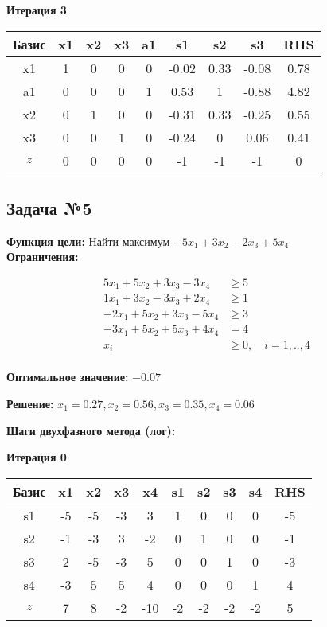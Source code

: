 \documentclass[a4paper,12pt]{article}
\begin{document}
 \textbf{Итерация 3}\\
\begin{tabular}{|c|c|c|c|c|c|c|c|c|}
\hline
Базис & x1 & x2 & x3 & a1 & s1 & s2 & s3 & RHS \\ \hline
x1 & 1 & 0 & 0 & 0 & -0.02 & 0.33 & -0.08 & 0.78 \\ \hline
a1 & 0 & 0 & 0 & 1 & 0.53 & 1 & -0.88 & 4.82 \\ \hline
x2 & 0 & 1 & 0 & 0 & -0.31 & 0.33 & -0.25 & 0.55 \\ \hline
x3 & 0 & 0 & 1 & 0 & -0.24 & 0 & 0.06 & 0.41 \\ \hline
$z$ & 0 & 0 & 0 & 0 & -1 & -1 & -1 & 0 \\ \hline
\end{tabular}
\vspace{5mm}



\subsection*{Задача №5}
\textbf{Функция цели: }
Найти максимум $ -5x_{1} +3x_{2} -2x_{3} +5x_{4} $\\

\textbf{Ограничения:}

\[ \begin{aligned}
5x_{1} +5x_{2} +3x_{3} -3x_{4} &\ge 5 \\
1x_{1} +3x_{2} -3x_{3} +2x_{4} &\ge 1 \\
-2x_{1} +5x_{2} +3x_{3} -5x_{4} &\ge 3 \\
-3x_{1} +5x_{2} +5x_{3} +4x_{4} &= 4 \\
x_i &\ge 0,\quad i=1,..,4\\
\end{aligned}\]

\textbf{Оптимальное значение: }$-0.07$

\textbf{Решение: }$x_{1}=0.27, x_{2}=0.56, x_{3}=0.35, x_{4}=0.06$

\textbf{Шаги двухфазного метода (лог):}


 \textbf{Итерация 0}\\
\begin{tabular}{|c|c|c|c|c|c|c|c|c|c|}
\hline
Базис & x1 & x2 & x3 & x4 & s1 & s2 & s3 & s4 & RHS \\ \hline
s1 & -5 & -5 & -3 & 3 & 1 & 0 & 0 & 0 & -5 \\ \hline
s2 & -1 & -3 & 3 & -2 & 0 & 1 & 0 & 0 & -1 \\ \hline
s3 & 2 & -5 & -3 & 5 & 0 & 0 & 1 & 0 & -3 \\ \hline
s4 & -3 & 5 & 5 & 4 & 0 & 0 & 0 & 1 & 4 \\ \hline
$z$ & 7 & 8 & -2 & -10 & -2 & -2 & -2 & -2 & 5 \\ \hline
\end{tabular}
\vspace{5mm}
\end{document}
